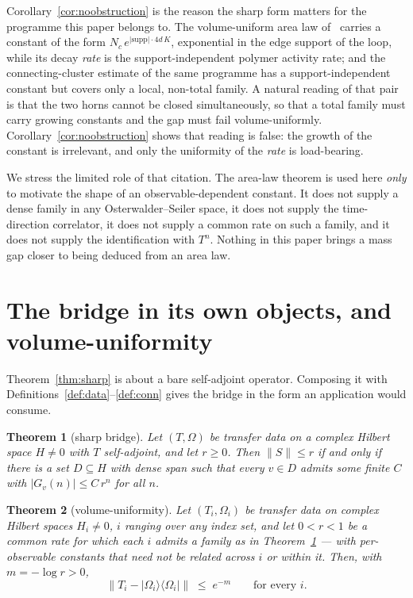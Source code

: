 \documentclass[11pt]{article}
\newtheorem{theorem}{Theorem}[section]
\theoremstyle{definition}
\newcommand{\Om}{\Omega}
\newcommand{\ket}[1]{|#1\rangle}
\newcommand{\bra}[1]{\langle #1|}
\begin{document}
Corollary~\ref{cor:noobstruction} is the reason the sharp form matters
for the programme this paper belongs to.  The volume-uniform area
law of~\cite{ErikssonAreaLaw} carries a constant of the form
$N_c\,e^{|\mathrm{supp}| \cdot 4d\,K}$, exponential in the edge support
of the loop, while its decay \emph{rate} is the support-independent
polymer activity rate; and the connecting-cluster estimate of the same
programme has a support-independent constant but covers only a local,
non-total family.  A natural reading of that pair is that the two horns
cannot be closed simultaneously, so that a total family must carry
growing constants and the gap must fail volume-uniformly.
Corollary~\ref{cor:noobstruction} shows that reading is false: the growth
of the constant is irrelevant, and only the uniformity of the
\emph{rate} is load-bearing.

We stress the limited role of that citation.  The area-law theorem is used
here \emph{only} to motivate the shape of an observable-dependent
constant.  It does not supply a dense family in any Osterwalder--Seiler
space, it does not supply the time-direction correlator, it does not
supply a common rate on such a family, and it does not supply the
identification with $T^n$.  Nothing in this paper brings a mass gap closer
to being deduced from an area law.

\section{The bridge in its own objects, and volume-uniformity}
\label{sec:vu}

Theorem~\ref{thm:sharp} is about a bare self-adjoint operator.  Composing
it with Definitions~\ref{def:data}--\ref{def:conn} gives the bridge in
the form an application would consume.

\begin{theorem}[sharp bridge]
\label{thm:sharpbridge}
Let $(T,\Om)$ be transfer data on a complex Hilbert space $H \neq 0$ with
$T$ self-adjoint, and let $r \ge 0$.  Then $\|S\| \le r$ if and only if
there is a set $D \subseteq H$ with dense span such that every $v \in D$
admits some finite $C$ with $|G_v(n)| \le C\,r^n$ for all $n$.
\end{theorem}

\begin{theorem}[volume-uniformity]
\label{thm:vu}
Let $(T_i,\Om_i)$ be transfer data on complex Hilbert spaces $H_i \neq 0$,
$i$ ranging over any index set, and let $0 < r < 1$ be a \emph{common}
rate for which each $i$ admits a family as in
Theorem~\ref{thm:sharpbridge} --- with per-observable constants that need
not be related across $i$ or within it.  Then, with $m = -\log r > 0$,
\[
  \|T_i - \ket{\Om_i}\bra{\Om_i}\| \;\le\; e^{-m}
  \qquad\text{for every } i .
\]
\end{theorem}
\end{document}

